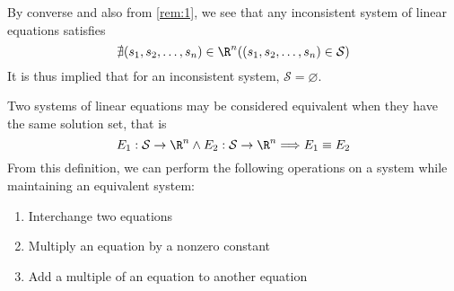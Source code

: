 	By converse and also from \ref{rem:1}, we see that any inconsistent system of linear equations satisfies
	$$\nexists(s_1,s_2,\ldots,s_n)\in\R^n((s_1,s_2,\ldots,s_n)\in \mathcal{S})$$
	It is thus implied that for an inconsistent system, $\mathcal{S}=\varnothing$.
\begin{theorem}\label{thm:1}
	Two systems of linear equations may be considered equivalent when they have the same solution set, that is
	$$E_1:\mathcal{S}\rightarrow\R^n\land E_2:\mathcal{S}\rightarrow\R^n\Longrightarrow E_1\equiv E_2$$
	From this definition, we can perform the following operations on a system while maintaining an equivalent system:
	\begin{enumerate}
		\item Interchange two equations
		\item Multiply an equation by a nonzero constant
		\item Add a multiple of an equation to another equation
	\end{enumerate}
\end{theorem}
